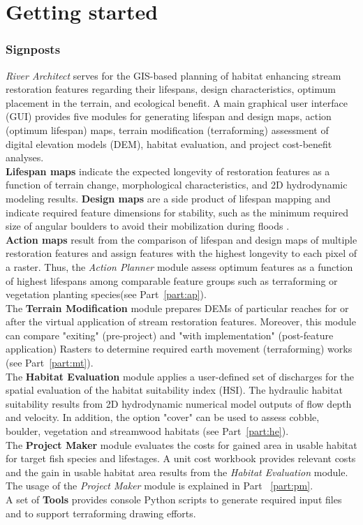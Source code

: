 \part{Getting started}
\section{Signposts}
\textit{River Architect} serves for the GIS-based planning of habitat enhancing stream restoration features regarding their lifespans, design characteristics, optimum placement in the terrain, and ecological benefit. A main graphical user interface (GUI) provides five modules for generating lifespan and design maps, action (optimum lifespan) maps, terrain modification (terraforming) assessment of digital elevation models (DEM), habitat evaluation, and project cost-benefit analyses.\\

\textbf{Lifespan maps} indicate the expected longevity of restoration features as a function of terrain change, morphological characteristics, and 2D hydrodynamic modeling results. \textbf{Design maps} are a side product of lifespan mapping and indicate required feature dimensions for stability, such as the minimum required size of angular boulders to avoid their mobilization during floods \citep[see Part~\ref{part:lf} and ][]{schwindt19a}.\\
\textbf{Action maps} result from the comparison of lifespan and design maps of multiple restoration features and assign features with the highest longevity to each pixel of a raster. Thus, the \textit{Action Planner} module assess optimum features as a function of highest lifespans among comparable feature groups such as terraforming or vegetation planting species(see Part~\ref{part:ap}).\\
The \textbf{Terrain Modification} module prepares DEMs of particular reaches for or after the virtual application of stream restoration features. Moreover, this module can compare "exiting" (pre-project) and "with implementation" (post-feature application) Rasters to determine required earth movement (terraforming) works (see Part~\ref{part:mt}).\\
The \textbf{Habitat Evaluation} module applies a user-defined set of discharges for the spatial evaluation of the habitat suitability index (HSI). The hydraulic habitat suitability results from 2D hydrodynamic numerical model outputs of flow depth and velocity. In addition, the option "cover" can be used to assess cobble, boulder, vegetation and streamwood habitats (see Part~\ref{part:he}).\\
The \textbf{Project Maker} module evaluates the costs for gained area in usable habitat for target fish species and lifestages. A unit cost workbook provides relevant costs and the gain in usable habitat area results from the \textit{Habitat Evaluation} module. The usage of the \textit{Project Maker} module is explained in Part ~\ref{part:pm}.\\
A set of \textbf{Tools} provides console Python scripts to generate required input files and to support terraforming drawing efforts.\\

